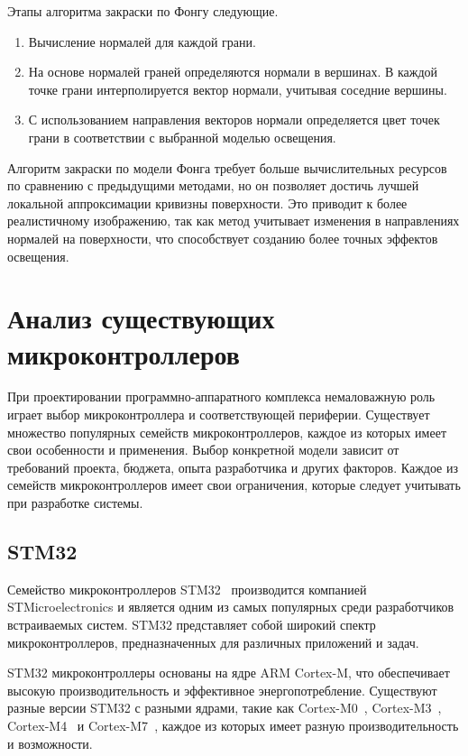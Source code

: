 Этапы алгоритма закраски по Фонгу следующие.
\begin{enumerate}
    \item Вычисление нормалей для каждой грани.
    \item На основе нормалей граней определяются нормали в вершинах. 
    В каждой точке грани интерполируется вектор нормали, учитывая соседние вершины.
    \item С использованием направления векторов нормали определяется цвет точек грани в соответствии с выбранной моделью освещения.
\end{enumerate}

Алгоритм закраски по модели Фонга требует больше вычислительных ресурсов по сравнению с предыдущими методами, но он позволяет достичь лучшей локальной аппроксимации кривизны поверхности. 
Это приводит к более реалистичному изображению, так как метод учитывает изменения в направлениях нормалей на поверхности, что способствует созданию более точных эффектов освещения.

\section{Анализ существующих микроконтроллеров}

При проектировании программно-аппаратного комплекса немаловажную роль играет выбор микроконтроллера и соответствующей периферии.
Существует множество популярных семейств микроконтроллеров, каждое из которых имеет свои особенности и применения. Выбор конкретной модели зависит от требований проекта, бюджета, опыта разработчика и других факторов. Каждое из семейств микроконтроллеров имеет свои ограничения, которые следует учитывать при разработке системы.

\subsection{STM32}

Семейство микроконтроллеров STM32~\cite{stm32} производится компанией STMicroelectronics и является одним из самых популярных среди разработчиков встраиваемых систем. 
STM32 представляет собой широкий спектр микроконтроллеров, предназначенных для различных приложений и задач.

STM32 микроконтроллеры основаны на ядре ARM Cortex-M, что обеспечивает высокую производительность и эффективное энергопотребление.
Существуют разные версии STM32 с разными ядрами, такие как Cortex-M0~\cite{cortex-m0}, Cortex-M3~\cite{cortex-m3}, Cortex-M4~\cite{cortex-m4} и Cortex-M7~\cite{cortex-m7}, каждое из которых имеет разную производительность и возможности.

